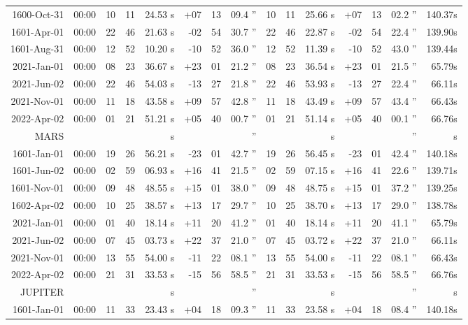 \begin{longtable}{r@{\,}r|r@{h\,}r@{m\,}r<{s}|r@{°\,}r@{'\,}r<{''}||r@{h\,}r@{m\,}r<{s}|r@{°\,}r@{'\,}r<{''}r<{s}}
 1600-Oct-31 & 00:00  &   10 & 11 & 24.53 & +07 & 13 & 09.4 & 10&11&25.66 & +07&13&02.2 & 140.37\\ %
 1601-Apr-01 & 00:00  &   22 & 46 & 21.63 & -02 & 54 & 30.7 & 22&46&22.87 & -02&54&22.4 & 139.90\\ %
 1601-Aug-31 & 00:00  &   12 & 52 & 10.20 & -10 & 52 & 36.0 & 12&52&11.39 & -10&52&43.0 & 139.44\\ %
 2021-Jan-01 & 00:00  &   08 & 23 & 36.67 & +23 & 01 & 21.2 & 08&23&36.54 & +23&01&21.5 & 65.79\\ %
 2021-Jun-02 & 00:00  &   22 & 46 & 54.03 & -13 & 27 & 21.8 & 22&46&53.93 & -13&27&22.4 & 66.11\\ %
 2021-Nov-01 & 00:00  &   11 & 18 & 43.58 & +09 & 57 & 42.8 & 11&18&43.49 & +09&57&43.4 & 66.43\\ %
 2022-Apr-02 & 00:00  &   01 & 21 & 51.21 & +05 & 40 & 00.7 & 01&21&51.14 & +05&40&00.1 & 66.76\\ %
MARS       \\
 1601-Jan-01 & 00:00  &   19 & 26 & 56.21 & -23 & 01 & 42.7 & 19&26&56.45 & -23&01&42.4 & 140.18\\ %
 1601-Jun-02 & 00:00  &   02 & 59 & 06.93 & +16 & 41 & 21.5 & 02&59&07.15 & +16&41&22.6 & 139.71\\ %
 1601-Nov-01 & 00:00  &   09 & 48 & 48.55 & +15 & 01 & 38.0 & 09&48&48.75 & +15&01&37.2 & 139.25\\ %
 1602-Apr-02 & 00:00  &   10 & 25 & 38.57 & +13 & 17 & 29.7 & 10&25&38.70 & +13&17&29.0 & 138.78\\ %
 2021-Jan-01 & 00:00  &   01 & 40 & 18.14 & +11 & 20 & 41.2 & 01&40&18.14 & +11&20&41.1 & 65.79\\ %
 2021-Jun-02 & 00:00  &   07 & 45 & 03.73 & +22 & 37 & 21.0 & 07&45&03.72 & +22&37&21.0 & 66.11\\ %
 2021-Nov-01 & 00:00  &   13 & 55 & 54.00 & -11 & 22 & 08.1 & 13&55&54.00 & -11&22&08.1 & 66.43\\ %
 2022-Apr-02 & 00:00  &   21 & 31 & 33.53 & -15 & 56 & 58.5 & 21&31&33.53 & -15&56&58.5 & 66.76\\ %
JUPITER          \\
 1601-Jan-01 & 00:00  &   11 & 33 & 23.43 & +04 & 18 & 09.3 & 11&33&23.58 & +04&18&08.4 & 140.18\\ %

\end{longtable}

